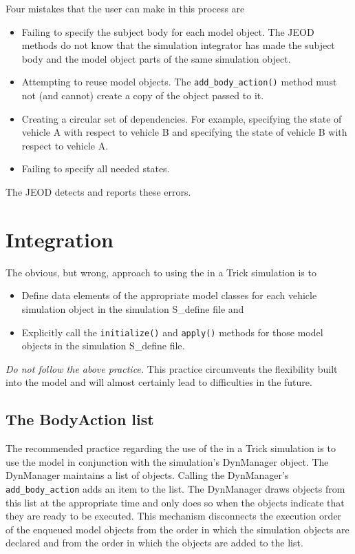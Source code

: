 Four mistakes that the user can make in this process are
\begin{itemize}
\item Failing to specify the subject body for each model object.
The JEOD methods do not know that the simulation integrator has made the
subject body and the model object parts of the same simulation object.
\item Attempting to reuse model objects. The {\tt add\_body\_action()}
method must not (and cannot) create a copy of the object passed to it.
\item Creating a circular set of dependencies. For example,
specifying the state of vehicle A with respect to vehicle B and
specifying the state of vehicle B with respect to vehicle A.
\item Failing to specify all needed states.
\end{itemize}
The JEOD detects and reports these errors.

\section{Integration}

The obvious, but wrong, approach to using the \ModelDesc in a Trick
simulation is to
\begin{itemize}
\item Define data elements of the appropriate model classes
for each vehicle simulation object in the simulation S\_define file and
\item Explicitly call the {\tt initialize()} and {\tt apply()} methods
for those model objects in the simulation S\_define file.
\end{itemize}

{\em Do not follow the above practice.} This practice circumvents the
flexibility built into the model and will almost certainly lead to
difficulties in the future.

\subsection{The BodyAction list}

The recommended practice regarding the use of the \ModelDesc in a
Trick simulation is to use the model in conjunction with the
simulation's DynManager object. The DynManager maintains a list
of \ModelDesc objects. Calling the DynManager's {\tt add\_body\_action}
adds an item to the list. The DynManager draws objects from this list
at the appropriate time and only does so when the objects indicate
that they are ready to be executed. This mechanism disconnects the
execution order of the enqueued model objects from the order in
which the simulation objects are declared and from the order
in which the objects are added to the list.

